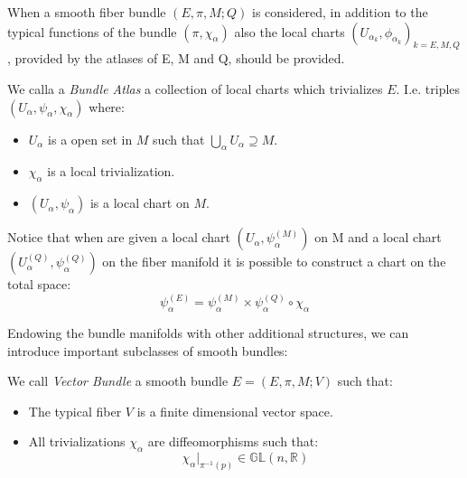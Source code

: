 \documentclass[Main]{subfiles}
\begin{document}
			When a smooth fiber bundle $(E,\pi,M;Q)$ is considered, in addition to the typical functions of the bundle $(\pi, \chi_{\alpha})$ also the local charts $(U_{\alpha_k}, \phi_{\alpha_k})_{k = E,M,Q}$, provided by the atlases of E, M and Q, should be provided.
			\begin{definition}
				We calla a \emph{Bundle Atlas} a collection of local charts which trivializes $E$. I.e. triples  $(U_\alpha, \psi_\alpha, \chi_\alpha)$ where:
				\begin{itemize}
					\item $U_\alpha$ is a open set in $M$ such that $\bigcup_{\alpha} U_{\alpha} \supseteq M$.
					\item $\chi_\alpha$  is a local trivialization.
					\item $(U_\alpha,\psi_\alpha)$ is a local chart on $M$.
				\end{itemize}		
			\end{definition}

			Notice that when are given a local chart $(U_\alpha, \psi_\alpha^{(M)} )$ on M and a local chart $(U_\alpha^{(Q)}, \psi_\alpha^{(Q)})$ on the fiber manifold it is possible to construct a chart on the total space:	
				\begin{displaymath}
							\psi^{(E)}_\alpha = \psi_\alpha^{(M)} \times  \psi_\alpha^{(Q)} \circ \chi_\alpha
				\end{displaymath}	
			\vspace{3mm}			
			
			Endowing the bundle manifolds with other additional structures, we can introduce important subclasses of smooth bundles:
			\begin{definition}
				We call \emph{Vector Bundle} a smooth bundle $E=(E,\pi,M;V)$ such that:
				\begin{itemize}
					\item The typical fiber $V$ is a finite dimensional vector space.	
					\item All trivializations $\chi_{\alpha} $ are diffeomorphisms such that:
						\begin{displaymath}
							\chi_{\alpha}\vert_{\pi^{-1}(p)} \in \mathbb{GL}(n, \mathbb{R})
						\end{displaymath}
				\end{itemize}
			\end{definition}
\end{document}
